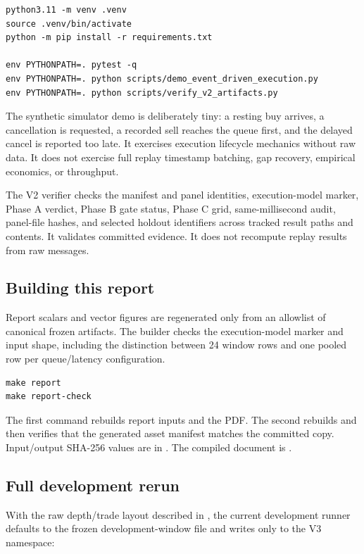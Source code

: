 \begin{lstlisting}[style=projectcode]
python3.11 -m venv .venv
source .venv/bin/activate
python -m pip install -r requirements.txt

env PYTHONPATH=. pytest -q
env PYTHONPATH=. python scripts/demo_event_driven_execution.py
env PYTHONPATH=. python scripts/verify_v2_artifacts.py
\end{lstlisting}

The synthetic simulator demo is deliberately tiny: a resting buy arrives, a
cancellation is requested, a recorded sell reaches the queue first, and the
delayed cancel is reported too late. It exercises execution lifecycle mechanics
without raw data. It does not exercise full replay timestamp batching, gap
recovery, empirical economics, or throughput.

The V2 verifier checks the manifest and panel identities, execution-model
marker, Phase A verdict, Phase B gate status, Phase C grid, same-millisecond
audit, panel-file hashes, and selected holdout identifiers across tracked
result paths and contents. It validates committed evidence. It does not
recompute replay results from raw messages.

\subsection{Building this report}

Report scalars and vector figures are regenerated only from an allowlist of
canonical frozen artifacts. The builder checks the execution-model marker and
input shape, including the distinction between 24 window rows and one pooled
row per queue/latency configuration.

\begin{lstlisting}[style=projectcode]
make report
make report-check
\end{lstlisting}

The first command rebuilds report inputs and the PDF. The second rebuilds and
then verifies that the generated asset manifest matches the committed copy.
Input/output SHA-256 values are in
. The compiled document is
.

\subsection{Full development rerun}

With the raw depth/trade layout described in , the current
development runner defaults to the frozen development-window file and writes
only to the V3 namespace:

